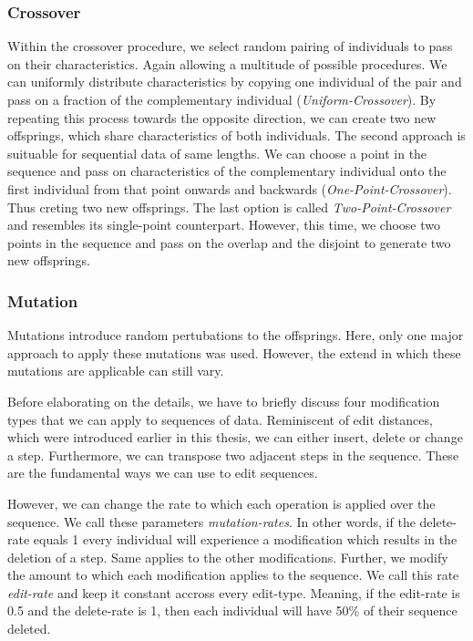 \documentclass[./../../paper.tex]{subfiles}
\begin{document}
\subsubsection{Crossover}
Within the crossover procedure, we select random pairing of individuals to pass on their characteristics. Again allowing a multitude of possible procedures. We can uniformly distribute characteristics by copying one individual of the pair and pass on a fraction of the complementary individual (\emph{Uniform-Crossover}). By repeating this process towards the opposite direction, we can create two new offsprings, which share characteristics of both individuals. The second approach is suituable for sequential data of same lengths. We can choose a point in the sequence and pass on characteristics of the complementary individual onto the first individual from that point onwards and backwards (\emph{One-Point-Crossover}). Thus creting two new offsprings. The last option is called \emph{Two-Point-Crossover} and resembles its single-point counterpart. However, this time, we choose two points in the sequence and pass on the overlap and the disjoint to generate two new offsprings.


\subsubsection{Mutation}
Mutations introduce random pertubations to the offsprings. Here, only one major approach to apply these mutations was used. However, the extend in which these mutations are applicable can still vary. 

Before elaborating on the details, we have to briefly discuss four modification types that we can apply to sequences of data. Reminiscent of edit distances, which were introduced earlier in this thesis, we can either insert, delete or change a step. Furthermore, we can transpose two adjacent steps in the sequence. These are the fundamental ways we can use to edit sequences.

However, we can change the rate to which each operation is applied over the sequence. We call these parameters \emph{mutation-rates}. In other words, if the delete-rate equals 1 every individual will experience a modification which results in the deletion of a step. Same applies to the other modifications. Further, we modify the amount to which each modification applies to the sequence. We call this rate \emph{edit-rate} and keep it constant accross every edit-type. Meaning, if the edit-rate is 0.5 and the delete-rate is 1, then each individual will have 50\% of their sequence deleted.     
\end{document}
